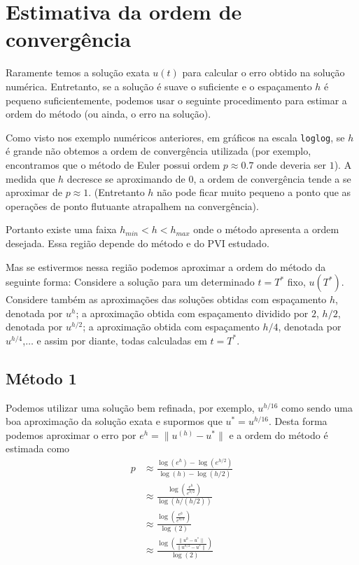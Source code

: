 \section{Estimativa da ordem de convergência}

Raramente temos a solução exata $u(t)$ para calcular o erro obtido na solução numérica. Entretanto, se a solução é suave o suficiente e o espaçamento $h$ é pequeno suficientemente, podemos usar o seguinte procedimento para estimar a ordem do método (ou ainda, o erro na solução).

Como visto nos exemplo numéricos anteriores, em gráficos na escala \verb#loglog#, se $h$ é grande não obtemos a ordem de convergência utilizada (por exemplo, encontramos que o método de Euler possui ordem $p\approx 0.7$ onde deveria ser $1$). A medida que $h$ decresce se aproximando de $0$, a ordem de convergência tende a se aproximar de $p\approx 1$. (Entretanto $h$ não pode ficar muito pequeno a ponto que as operações de ponto flutuante atrapalhem na convergência).

Portanto existe uma faixa $h_{min} < h < h_{max}$ onde o método apresenta a ordem desejada. Essa região depende do método e do PVI estudado.

Mas se estivermos nessa região podemos aproximar a ordem do método da seguinte forma: Considere a solução para um determinado $t=T^*$ fixo, $u(T^*)$. Considere também as aproximações das soluções obtidas com espaçamento $h$, denotada por $u^{h}$; a aproximação obtida com espaçamento dividido por $2$, $h/2$, denotada por $u^{h/2}$; a aproximação obtida com espaçamento $h/4$, denotada por $u^{h/4}$,$\ldots $ e assim por diante, todas calculadas em $t=T^*$.

\subsection{Método 1}
Podemos utilizar uma solução bem refinada, por exemplo, $u^{h/16}$ como sendo uma boa aproximação da solução exata e supormos que $u^*=u^{h/16}$. Desta forma podemos aproximar o erro por $e^{h}=\|u^{(h)}-u^*\|$ e a ordem do método é estimada como
\begin{eqnarray}
  p  & \approx  \frac{ \log(e^{h})-\log(e^{h/2})}{\log(h)-\log(h/2)} \\
     & \approx  \frac{ \log \left(   \frac{e^{h}}{e^{h/2}} \right)  }{\log(h /(h/2))} \\
     & \approx  \frac{ \log \left(   \frac{e^{h}}{e^{h/2}} \right)  }{\log(2)} \\
     & \approx  \frac{ \log \left(   \frac{\|u^{h}-u^*\|}{\|u^{h/2}-u^*\|} \right)  }{\log(2)} \\
\end{eqnarray}

